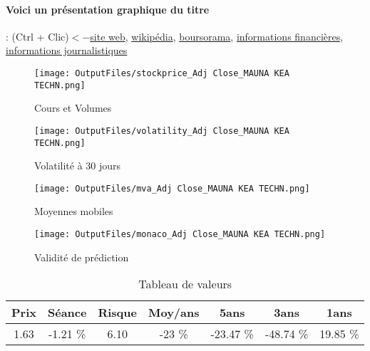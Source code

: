 \documentclass[11pt,a4paper]{report}%
\begin{document}
\paragraph{Voici un présentation graphique du titre} : (Ctrl + Clic)$<-$\href{https://www.maunakeatech.com/fr/}{site web}, \href{https://fr.wikipedia.org/wiki/Mauna_Kea_Technologies}{wikipédia}, \href{https://www.boursorama.com/cours/1rPMKEA}{boursorama}, \href{https://www.qwant.com/?q=site:https:%2f%2fwww.easybourse.com%2faction-societe%2fMAUNA-KEA-TECHN&t=web&client=ext-firefox-hp}{informations financières}, \href{https://bourse.lerevenu.com/cours-de-bourse/fiche-valeur-synthese/MAUNA-KEA-TECHN/MKEA-FR}{informations journalistiques}
\begin{figure}[!htb]
   \begin{minipage}{0.5\textwidth}
     \centering
     \texttt{[image: OutputFiles/stockprice\_Adj Close\_MAUNA KEA TECHN.png]}
     \caption{Cours et Volumes}\label{Fig:price_MAUNA KEA TECHN}
   \end{minipage}\hfill
   \begin{minipage}{0.5\textwidth}
     \centering
     \texttt{[image: OutputFiles/volatility\_Adj Close\_MAUNA KEA TECHN.png]}
     \caption{Volatilité à 30 jours}\label{Fig:volat_MAUNA KEA TECHN}
   \end{minipage}
\end{figure}
\begin{figure}[!htb]
   \begin{minipage}{0.5\textwidth}
     \centering
     \texttt{[image: OutputFiles/mva\_Adj Close\_MAUNA KEA TECHN.png]}
     \caption{Moyennes mobiles}\label{Fig:mva_MAUNA KEA TECHN}
   \end{minipage}\hfill
   \begin{minipage}{0.5\textwidth}
     \centering
     \texttt{[image: OutputFiles/monaco\_Adj Close\_MAUNA KEA TECHN.png]}
     \caption{Validité de prédiction}\label{Fig:prediction_MAUNA KEA TECHN}
   \end{minipage}
\end{figure}

\begin{table}[H]
  \centering
    \begin{tabular}{|c|c|c|c|c|c|c|}
    \hline
    Prix & Séance & Risque  & Moy/ans & 5ans & 3ans & 1ans \\
    \hline
    1.63 &    -1.21 \%    & 6.10 & -23 \% & -23.47 \% & -48.74 \% & 19.85 \% \\
    \hline
    \end{tabular}%
        \label{tab:table_MA19.85A KEA TECHN}%
      \caption{Tableau de valeurs}
\end{table}%
\end{document}
